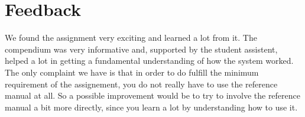 \section{Feedback}\label{chapted:assignment_feedback}

We found the assignment very exciting and learned a lot from it. The compendium was very informative and, supported by the student assistent, helped a lot in getting a fundamental understanding of how the system worked. The only complaint we have is that in order to do fulfill the minimum requirement of the assignement, you do not really have to use the reference manual at all. So a possible improvement would be to try to involve the reference manual a bit more directly, since you learn a lot by understanding how to use it. 